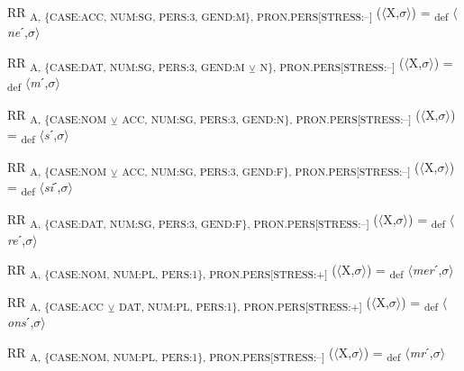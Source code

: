 {\begin{exe}
 RR \textsubscript{A, \{CASE:ACC, NUM:SG, PERS:3, GEND:M\}, PRON.PERS[STRESS:–]} ($\langle$X,$\sigma $$\rangle$) = \textsubscript{def} $\langle$\textit{ne}ˊ,$\sigma $$\rangle$
\end{exe}

\begin{exe}
 RR \textsubscript{A, \{CASE:DAT, NUM:SG, PERS:3, GEND:M} \textsubscript{${\veebar}$}\textsubscript{ N\}, PRON.PERS[STRESS:–]} ($\langle$X,$\sigma $$\rangle$) = \textsubscript{def} $\langle$\textit{m}ˊ,$\sigma $$\rangle$
\end{exe}

\begin{exe}
 RR \textsubscript{A, \{CASE:NOM} \textsubscript{${\veebar}$}\textsubscript{ ACC, NUM:SG, PERS:3, GEND:N\}, PRON.PERS[STRESS:–]} ($\langle$X,$\sigma $$\rangle$) = \textsubscript{def} $\langle$\textit{s}ˊ,$\sigma $$\rangle$
\end{exe}

\begin{exe}
 RR \textsubscript{A, \{CASE:NOM} \textsubscript{${\veebar}$}\textsubscript{ ACC, NUM:SG, PERS:3, GEND:F\}, PRON.PERS[STRESS:–]} ($\langle$X,$\sigma $$\rangle$) = \textsubscript{def} $\langle$\textit{si}ˊ,$\sigma $$\rangle$
\end{exe}

\begin{exe}
 RR \textsubscript{A, \{CASE:DAT, NUM:SG, PERS:3, GEND:F\}, PRON.PERS[STRESS:–]} ($\langle$X,$\sigma $$\rangle$) = \textsubscript{def} $\langle$\textit{re}ˊ,$\sigma $$\rangle$
\end{exe}

\begin{exe}
 RR \textsubscript{A, \{CASE:NOM, NUM:PL, PERS:1\}, PRON.PERS[STRESS:+]} ($\langle$X,$\sigma $$\rangle$) = \textsubscript{def} $\langle$\textit{mer}ˊ,$\sigma $$\rangle$
\end{exe}

\begin{exe}
 RR \textsubscript{A, \{CASE:ACC} \textsubscript{${\veebar}$}\textsubscript{ DAT, NUM:PL, PERS:1\}, PRON.PERS[STRESS:+]} ($\langle$X,$\sigma $$\rangle$) = \textsubscript{def} $\langle$\textit{ons}ˊ,$\sigma $$\rangle$
\end{exe}

\begin{exe}
 RR \textsubscript{A, \{CASE:NOM, NUM:PL, PERS:1\}, PRON.PERS[STRESS:–]} ($\langle$X,$\sigma $$\rangle$) = \textsubscript{def} $\langle$\textit{mr}ˊ,$\sigma $$\rangle$
\end{exe}

}
